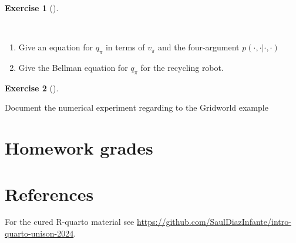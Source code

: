 \documentclass[
  letterpaper,
]{krantz}
\providecommand{\tightlist}{%
  \setlength{\itemsep}{0pt}\setlength{\parskip}{0pt}}\usepackage{longtable,booktabs,array}
\theoremstyle{plain}
\theoremstyle{definition}
\theoremstyle{definition}
\newtheorem{exercise}{Exercise}[chapter]
\theoremstyle{remark}
\begin{document}
\begin{exercise}[]\protect\hypertarget{exr--hw_003_05}{}\label{exr--hw_003_05}

~

\begin{enumerate}
\def\labelenumi{\arabic{enumi}.}
\tightlist
\item
  Give an equation for \(q_{\pi}\) in terms of \(v_{\pi}\) and the
  four-argument \(p(\cdot,\cdot|\cdot,\cdot)\)
\item
  Give the Bellman equation for \(q_{\pi}\) for the recycling robot.
\end{enumerate}

\end{exercise}

\begin{exercise}[]\protect\hypertarget{exr--hw_003_06}{}\label{exr--hw_003_06}

Document the numerical experiment regarding to the Gridworld example

\end{exercise}


\chapter{Homework grades}\label{homework-grades}


\chapter*{References}\label{references}


For the cured R-quarto material see
\url{https://github.com/SaulDiazInfante/intro-quarto-unison-2024}.
\end{document}
